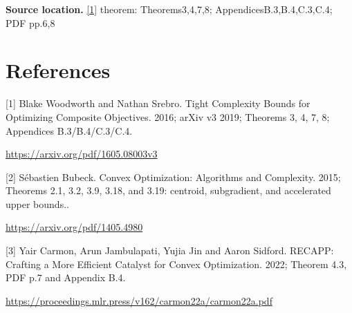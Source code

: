 \documentclass[10pt,a4paper]{article}
\begin{document}
\textbf{Source location.} \href{https://arxiv.org/pdf/1605.08003v3}{[1]} theorem: Theorems3,4,7,8; AppendicesB.3,B.4,C.3,C.4; PDF pp.6,8

\section{References}
[1] Blake Woodworth and Nathan Srebro. Tight Complexity Bounds for Optimizing Composite Objectives. 2016; arXiv v3 2019; Theorems 3, 4, 7, 8; Appendices B.3/B.4/C.3/C.4.

\url{https://arxiv.org/pdf/1605.08003v3}

[2] Sébastien Bubeck. Convex Optimization: Algorithms and Complexity. 2015; Theorems 2.1, 3.2, 3.9, 3.18, and 3.19: centroid, subgradient, and accelerated upper bounds..

\url{https://arxiv.org/pdf/1405.4980}

[3] Yair Carmon, Arun Jambulapati, Yujia Jin and Aaron Sidford. RECAPP: Crafting a More Efficient Catalyst for Convex Optimization. 2022; Theorem 4.3, PDF p.7 and Appendix B.4.

\url{https://proceedings.mlr.press/v162/carmon22a/carmon22a.pdf}
\end{document}
